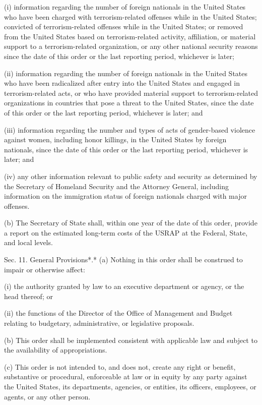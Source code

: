 (i) information regarding the number of foreign nationals in the United
States who have been charged with terrorism-related offenses while in
the United States; convicted of terrorism-related offenses while in the
United States; or removed from the United States based on
terrorism-related activity, affiliation, or material support to a
terrorism-related organization, or any other national security reasons
since the date of this order or the last reporting period, whichever is
later;

(ii) information regarding the number of foreign nationals in the United
States who have been radicalized after entry into the United States and
engaged in terrorism-related acts, or who have provided material support
to terrorism-related organizations in countries that pose a threat to
the United States, since the date of this order or the last reporting
period, whichever is later; and

(iii) information regarding the number and types of acts of gender-based
violence against women, including honor killings, in the United States
by foreign nationals, since the date of this order or the last reporting
period, whichever is later; and

(iv) any other information relevant to public safety and security as
determined by the Secretary of Homeland Security and the Attorney
General, including information on the immigration status of foreign
nationals charged with major offenses.

(b) The Secretary of State shall, within one year of the date of this
order, provide a report on the estimated long-term costs of the USRAP at
the Federal, State, and local levels.

Sec. 11. General Provisions*.* (a) Nothing in this order shall be
construed to impair or otherwise affect:

(i) the authority granted by law to an executive department or agency,
or the head thereof; or

(ii) the functions of the Director of the Office of Management and
Budget relating to budgetary, administrative, or legislative proposals.

(b) This order shall be implemented consistent with applicable law and
subject to the availability of appropriations.

(c) This order is not intended to, and does not, create any right or
benefit, substantive or procedural, enforceable at law or in equity by
any party against the United States, its departments, agencies, or
entities, its officers, employees, or agents, or any other person.

